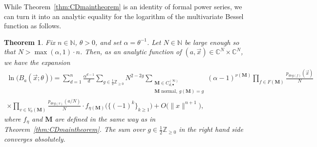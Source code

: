 \documentclass[11pt]{article}
\theoremstyle{plain}
\newtheorem{theorem}[lemma]{Theorem}
\newcommand{\Z}{\mathbb Z}
\newcommand{\C}{\mathbb C}
\newcommand{\N}{\mathbb N}
\newcommand{\MM}{\mathbf M}
\newcommand{\vecx}{\vec{x}}
\begin{document}
While Theorem~\ref{thm:CDmaintheorem} is an identity of formal power series, we can turn it into an analytic equality for the logarithm of the multivariate Bessel function as follows.

\begin{theorem}\label{thm:keyexpansion}
    Fix $n\in\N$, $\theta>0$, and set $\alpha=\theta^{-1}$. Let $N\in\N$ be large enough so that $N>\max(\alpha,1)\cdot n$. Then, as an analytic function of $(a,\vecx)\in \C^N\times \C^{N}$, we have the expansion
    \begin{multline}\label{eq_keyexpansion}
        \ln\Big(B_a(\vecx;\theta)\Big) = \sum_{d=1}^n\frac{\alpha^{d-1}}{d} \sum_{g\in\frac{1}{2}\Z_{\ge 0}} N^{2-2g} \sum_{\substack{\MM\in C^{(\infty)}_{d,\bullet} \\ \MM\text{ normal},\ g(\MM)=g}}(\alpha-1)^{\nu(\MM)} \prod_{f\in F(\MM)}\frac{p_{deg(f)}(\vecx)}{N}\\
        \times\prod_{v\in V_0(\MM)}\frac{p_{deg(v)}(a/N)}{N}\cdot f_{\eta(\MM)}\Big(\big\{(-1)^k\big\}_{k\ge 1}\Big)+O\big(\|x\|^{n+1}\big),
    \end{multline}
where $f_{\eta}$ and $\MM$ are defined in the same way as in Theorem~\ref{thm:CDmaintheorem}.
The sum over $g\in\frac{1}{2}\Z_{\ge 0}$ in the right hand side converges absolutely.
\end{theorem}
\end{document}
